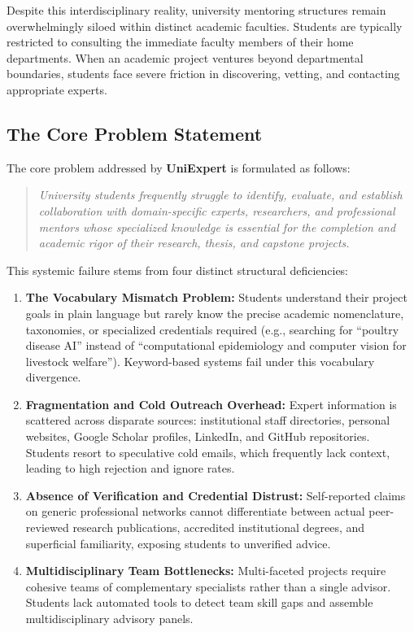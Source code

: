 \documentclass[11pt,a4paper]{article}
\begin{document}
Despite this interdisciplinary reality, university mentoring structures remain overwhelmingly siloed within distinct academic faculties. Students are typically restricted to consulting the immediate faculty members of their home departments. When an academic project ventures beyond departmental boundaries, students face severe friction in discovering, vetting, and contacting appropriate experts.

\subsection{The Core Problem Statement}
The core problem addressed by \textbf{UniExpert} is formulated as follows:
\begin{quote}
\textit{University students frequently struggle to identify, evaluate, and establish collaboration with domain-specific experts, researchers, and professional mentors whose specialized knowledge is essential for the completion and academic rigor of their research, thesis, and capstone projects.}
\end{quote}

This systemic failure stems from four distinct structural deficiencies:
\begin{enumerate}[label=\textbf{(\arabic*)}]
    \item \textbf{The Vocabulary Mismatch Problem:} Students understand their project goals in plain language but rarely know the precise academic nomenclature, taxonomies, or specialized credentials required (e.g., searching for ``poultry disease AI'' instead of ``computational epidemiology and computer vision for livestock welfare''). Keyword-based systems fail under this vocabulary divergence.
    \item \textbf{Fragmentation and Cold Outreach Overhead:} Expert information is scattered across disparate sources: institutional staff directories, personal websites, Google Scholar profiles, LinkedIn, and GitHub repositories. Students resort to speculative cold emails, which frequently lack context, leading to high rejection and ignore rates.
    \item \textbf{Absence of Verification and Credential Distrust:} Self-reported claims on generic professional networks cannot differentiate between actual peer-reviewed research publications, accredited institutional degrees, and superficial familiarity, exposing students to unverified advice.
    \item \textbf{Multidisciplinary Team Bottlenecks:} Multi-faceted projects require cohesive teams of complementary specialists rather than a single advisor. Students lack automated tools to detect team skill gaps and assemble multidisciplinary advisory panels.
\end{enumerate}
\end{document}
